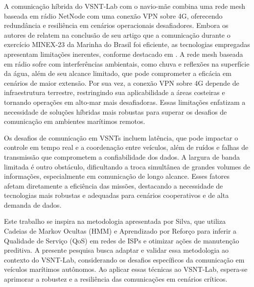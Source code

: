 A comunicação híbrida do VSNT-Lab com o navio-mãe combina uma rede mesh baseada em rádio NetNode com uma conexão VPN sobre 4G, oferecendo redundância e resiliência em cenários operacionais desafiadores. Embora os autores de \cite{VSNT_douglas2024} relatem na conclusão de seu artigo que a comunicação durante o exercício MINEX-23 da Marinha do Brasil foi eficiente, as tecnologias empregadas apresentam limitações inerentes, conforme destacado em \cite{Network_alqurashi2023}. A rede mesh baseada em rádio sofre com interferências ambientais, como chuva e reflexões na superfície da água, além de seu alcance limitado, que pode comprometer a eficácia em cenários de maior extensão. Por sua vez, a conexão VPN sobre 4G depende de infraestrutura terrestre, restringindo sua aplicabilidade a áreas costeiras e tornando operações em alto-mar mais desafiadoras. Essas limitações enfatizam a necessidade de soluções híbridas mais robustas para superar os desafios de comunicação em ambientes marítimos remotos.

Os desafios de comunicação em VSNTs incluem latência, que pode impactar o controle em tempo real e a coordenação entre veículos, além de ruídos e falhas de transmissão que comprometem a confiabilidade dos dados. A largura de banda limitada é outro obstáculo, dificultando a troca simultânea de grandes volumes de informações, especialmente em comunicação de longo alcance. Esses fatores afetam diretamente a eficiência das missões, destacando a necessidade de tecnologias mais robustas e adequadas para cenários cooperativos e de alta demanda de dados\cite{VSNT_ge2018}.

Este trabalho se inspira na metodologia apresentada por Silva\cite{Network_silva2021}, que utiliza Cadeias de Markov Ocultas (HMM) e Aprendizado por Reforço para inferir a Qualidade de Serviço (QoS) em redes de ISPs e otimizar ações de manutenção preditiva. A presente pesquisa busca adaptar e validar essa metodologia ao contexto do VSNT-Lab, considerando os desafios específicos da comunicação em veículos marítimos autônomos. Ao aplicar essas técnicas ao VSNT-Lab, espera-se aprimorar a robustez e a resiliência das comunicações em cenários críticos.

